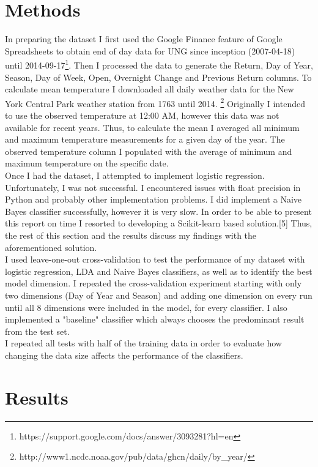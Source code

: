 \documentclass[conference,letterpaper]{IEEEtran}
\begin{document}
\section{Methods}
In preparing the dataset I first used the Google Finance feature of Google Spreadsheets to obtain end of day data for UNG
since inception (2007-04-18) until 2014-09-17\footnote{https://support.google.com/docs/answer/3093281?hl=en}. Then I processed 
the data to generate the Return, Day of Year, Season, Day of Week, Open, Overnight Change and Previous Return columns.
To calculate mean temperature I downloaded all daily weather data for the New York Central Park weather station from 1763 until 2014.
\footnote{http://www1.ncdc.noaa.gov/pub/data/ghcn/daily/by\_year/}
Originally I intended to use the observed temperature at 12:00 AM, however this data was not available for recent years.
Thus, to calculate the mean I averaged all minimum and maximum temperature measurements for a given day of the year. 
The observed temperature column I populated with the average of minimum and maximum temperature on the specific date. \\
\indent Once I had the dataset, I attempted to implement logistic regression. Unfortunately, I was not successful. I encountered
issues with float precision in Python and probably other implementation problems. I did implement a Naive Bayes classifier
successfully, however it is very slow.  In order to be able to present this report on time I resorted to developing 
a Scikit-learn based solution.[5] Thus, the rest of this section and the results discuss my findings with the aforementioned solution. \\
\indent I used leave-one-out cross-validation to test the performance of my dataset with logistic regression, LDA and Naive Bayes
classifiers, as well as to identify the best model dimension. I repeated the cross-validation experiment starting with only two
dimensions (Day of Year and Season) and adding one dimension on every run until all 8 dimensions were included in the model, for
every classifier. I also implemented a "baseline" classifier which always chooses the predominant result from the test set. \\
\indent I repeated all tests with half of the training data in order to evaluate how changing the data size affects the
performance of the classifiers. \\

\section{Results}
\end{document}
